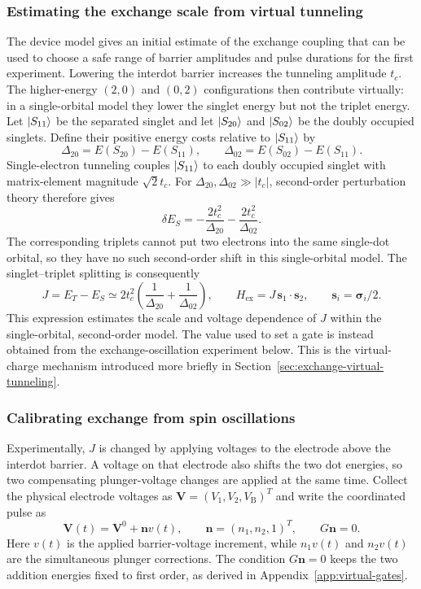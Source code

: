 \subsubsection{Estimating the exchange scale from virtual tunneling}
\label{sec:calibration-exchange-estimate}

The device model gives an initial estimate of the exchange coupling
that can be used to choose a safe range of barrier amplitudes and
pulse durations for the first experiment. Lowering the interdot
barrier increases the tunneling amplitude $t_c$. The higher-energy
$(2,0)$ and $(0,2)$ configurations then contribute virtually: in a
single-orbital model they lower the singlet energy but not the
triplet energy.
Let $\lvert S_{11}\rangle$ be the separated singlet and let
$\lvert S_{20}\rangle$ and $\lvert S_{02}\rangle$ be the doubly occupied singlets.
Define their positive energy costs relative to $\lvert S_{11}\rangle$ by
\[
 \Delta_{20}=E(S_{20})-E(S_{11}),\qquad
 \Delta_{02}=E(S_{02})-E(S_{11}).
\]
Single-electron tunneling couples $\lvert S_{11}\rangle$ to each doubly
occupied singlet with matrix-element magnitude $\sqrt2t_c$.
For $\Delta_{20},\Delta_{02}\gg |t_c|$, second-order perturbation
theory therefore gives
\[
 \delta E_S=-\frac{2t_c^2}{\Delta_{20}}
             -\frac{2t_c^2}{\Delta_{02}}.
\]
The corresponding triplets cannot put two electrons into the same
single-dot orbital, so they have no such second-order shift in this
single-orbital model. The singlet--triplet splitting is consequently
\[
 J=E_T-E_S\simeq
 2t_c^2\left(\frac1{\Delta_{20}}+\frac1{\Delta_{02}}\right),
 \qquad H_{\mathrm{ex}}=J\,\mathbf s_1\cdot\mathbf s_2,
 \qquad \mathbf s_i=\boldsymbol\sigma_i/2.
\]
This expression estimates the scale and voltage dependence of $J$
within the single-orbital, second-order model. The value used to set
a gate is instead obtained from the exchange-oscillation experiment
below.
This is the virtual-charge mechanism introduced more briefly in
Section~\ref{sec:exchange-virtual-tunneling}.

\subsubsection{Calibrating exchange from spin oscillations}
\label{sec:calibration-two-spin-exchange}
\label{sec:measurement-two-spin-exchange}

Experimentally, $J$ is changed by applying voltages to the electrode
above the interdot barrier. A voltage on that electrode also shifts
the two dot energies, so two compensating plunger-voltage changes are
applied at the same time. Collect the physical electrode voltages as
$\mathbf V=(V_1,V_2,V_{\mathrm B})^T$ and write the coordinated pulse as
\begin{equation}
 \mathbf V(t)=\mathbf V^0+\mathbf n v(t),\qquad
 \mathbf n=(n_1,n_2,1)^T,\qquad G\mathbf n=0.
 \label{eq:calibration-exchange-voltage-pulse}
\end{equation}
Here $v(t)$ is the applied barrier-voltage increment, while $n_1v(t)$
and $n_2v(t)$ are the simultaneous plunger corrections. The condition
$G\mathbf n=0$ keeps the two addition energies fixed to first order,
as derived in Appendix~\ref{app:virtual-gates}.

